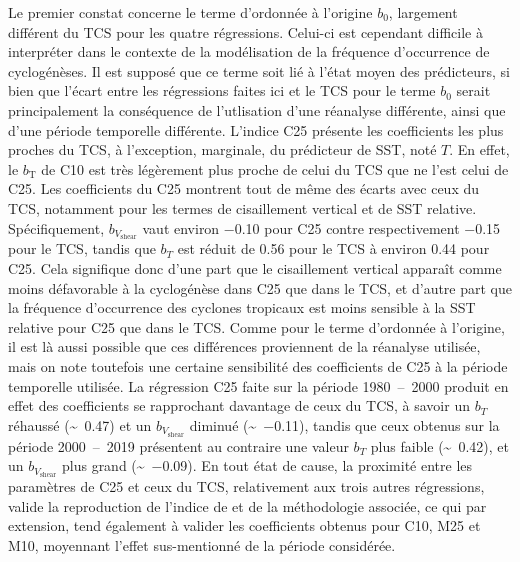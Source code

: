 \documentclass[../main.tex]{subfiles}
\begin{document}
Le premier constat concerne le terme d'ordonnée à l'origine $b_0$, largement différent du TCS pour les quatre régressions. Celui-ci est cependant difficile à
interpréter dans le contexte de la modélisation de la fréquence d'occurrence de cyclogénèses. Il est supposé que ce terme soit lié à l'état moyen des
prédicteurs, si bien que l'écart entre les régressions faites ici et le TCS pour le terme $b_0$ serait principalement la conséquence de l'utlisation d'une
réanalyse différente, ainsi que d'une période temporelle différente. L'indice C25 présente les coefficients les plus proches du TCS, à l'exception, marginale,
du prédicteur de SST, noté $T$. En effet, le $b_{\mathrm{T}}$ de C10 est très légèrement plus proche de celui du TCS que ne l'est celui de C25. Les coefficients
du C25 montrent tout de même des écarts avec ceux du TCS, notamment pour les termes de cisaillement vertical et de SST relative. Spécifiquement,
$b_{V_{\mathrm{shear}}}$ vaut environ \num{-0.10} pour C25 contre respectivement \num{-0.15} pour le TCS, tandis que $b_T$ est réduit de \num{0.56} pour le TCS
à environ \num{0.44} pour C25. Cela signifique donc d'une part que le cisaillement vertical apparaît comme moins défavorable à la cyclogénèse dans C25 que dans
le TCS, et d'autre part que la fréquence d'occurrence des cyclones tropicaux est moins sensible à la SST relative pour C25 que dans le TCS. Comme pour le terme
d'ordonnée à l'origine, il est là aussi possible que ces différences proviennent de la réanalyse utilisée, mais on note toutefois une certaine sensibilité des
coefficients de C25 à la période temporelle utilisée. La régression C25 faite sur la période \num{1980}~--~\num{2000} produit en effet des coefficients se
rapprochant davantage de ceux du TCS, à savoir un $b_T$ réhaussé (\sim~\num{0.47}) et un $b_{V_{\mathrm{shear}}}$ diminué (\sim~\num{-0.11}), tandis que ceux
obtenus sur la période \num{2000}~--~\num{2019} présentent au contraire une valeur $b_T$ plus faible (\sim~\num{0.42}), et un $b_{V_{\mathrm{shear}}}$ plus
grand (\sim~\num{-0.09}). En tout état de cause, la proximité entre les paramètres de C25 et ceux du TCS, relativement aux trois autres régressions, valide la
reproduction de l'indice de \textcite{tippett_poisson_2011} et de la méthodologie associée, ce qui par extension, tend également à valider les coefficients
obtenus pour C10, M25 et M10, moyennant l'effet sus-mentionné de la période considérée.
\end{document}
